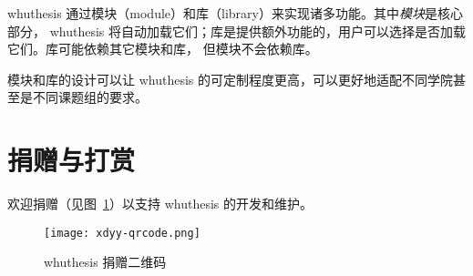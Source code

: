 whuthesis 通过模块（module）和库（library）来实现诸多功能。其中\emph{模块}是核心部分，
whuthesis 将自动加载它们；库是提供额外功能的，用户可以选择是否加载它们。库可能依赖其它模块和库，
但模块不会依赖库。


模块和库的设计可以让 whuthesis 的可定制程度更高，可以更好地适配不同学院甚至是不同课题组的要求。


\section{捐赠与打赏}

欢迎捐赠（见图~\ref{fig:donate}）以支持 whuthesis 的开发和维护。

\begin{figure}[htbp]
  \centering
  \texttt{[image: xdyy-qrcode.png]} 
  \caption{whuthesis 捐赠二维码}
  \label{fig:donate}
\end{figure}